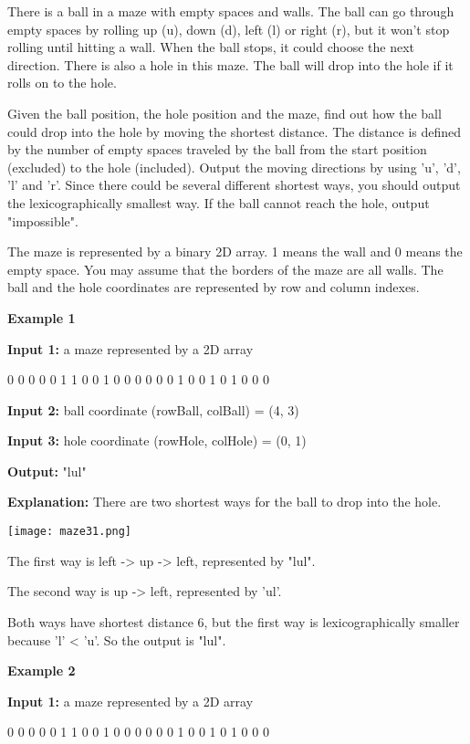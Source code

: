 There is a ball in a maze with empty spaces and walls. The ball can go through empty spaces by rolling up (u), down (d), left (l) or right (r), but it won't stop rolling until hitting a wall. When the ball stops, it could choose the next direction. There is also a hole in this maze. The ball will drop into the hole if it rolls on to the hole.

Given the ball position, the hole position and the maze, find out how the ball could drop into the hole by moving the shortest distance. The distance is defined by the number of empty spaces traveled by the ball from the start position (excluded) to the hole (included). Output the moving directions by using 'u', 'd', 'l' and 'r'. Since there could be several different shortest ways, you should output the lexicographically smallest way. If the ball cannot reach the hole, output "impossible".

The maze is represented by a binary 2D array. 1 means the wall and 0 means the empty space. You may assume that the borders of the maze are all walls. The ball and the hole coordinates are represented by row and column indexes.

\textbf{Example 1}

\textbf{Input 1:} a maze represented by a 2D array
\begin{Code}
0 0 0 0 0
1 1 0 0 1
0 0 0 0 0
0 1 0 0 1
0 1 0 0 0
\end{Code}

\textbf{Input 2:} ball coordinate (rowBall, colBall) = (4, 3)

\textbf{Input 3:} hole coordinate (rowHole, colHole) = (0, 1)

\textbf{Output:} "lul"

\textbf{Explanation:} There are two shortest ways for the ball to drop into the hole.

\begin{center}
\texttt{[image: maze31.png]}\\
\end{center}

The first way is left -> up -> left, represented by "lul".

The second way is up -> left, represented by 'ul'.

Both ways have shortest distance 6, but the first way is lexicographically smaller because 'l' < 'u'. So the output is "lul".

\textbf{Example 2}

\textbf{Input 1:} a maze represented by a 2D array
\begin{Code}
0 0 0 0 0
1 1 0 0 1
0 0 0 0 0
0 1 0 0 1
0 1 0 0 0
\end{Code}

